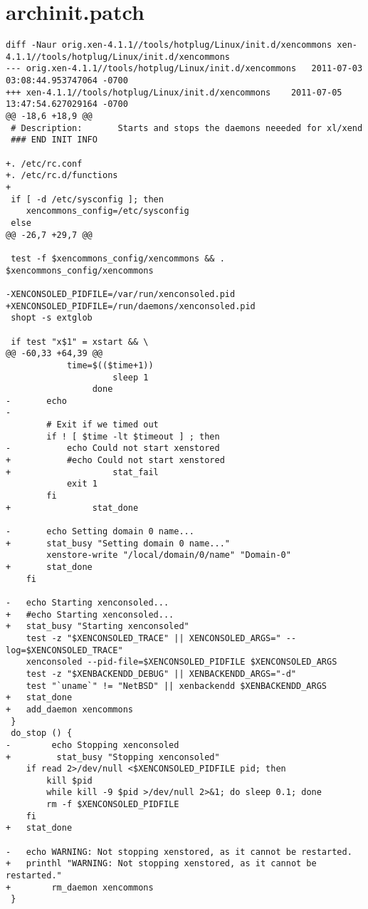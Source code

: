 \section{archinit.patch}
\begin{lstlisting}
diff -Naur orig.xen-4.1.1//tools/hotplug/Linux/init.d/xencommons xen-4.1.1//tools/hotplug/Linux/init.d/xencommons
--- orig.xen-4.1.1//tools/hotplug/Linux/init.d/xencommons	2011-07-03 03:08:44.953747064 -0700
+++ xen-4.1.1//tools/hotplug/Linux/init.d/xencommons	2011-07-05 13:47:54.627029164 -0700
@@ -18,6 +18,9 @@
 # Description:       Starts and stops the daemons neeeded for xl/xend
 ### END INIT INFO
 
+. /etc/rc.conf
+. /etc/rc.d/functions
+
 if [ -d /etc/sysconfig ]; then
 	xencommons_config=/etc/sysconfig
 else
@@ -26,7 +29,7 @@
 
 test -f $xencommons_config/xencommons && . $xencommons_config/xencommons
 
-XENCONSOLED_PIDFILE=/var/run/xenconsoled.pid
+XENCONSOLED_PIDFILE=/run/daemons/xenconsoled.pid
 shopt -s extglob
 
 if test "x$1" = xstart && \
@@ -60,33 +64,39 @@
 		    time=$(($time+1))
                     sleep 1
                 done
-		echo
-
 		# Exit if we timed out
 		if ! [ $time -lt $timeout ] ; then
-		    echo Could not start xenstored
+		    #echo Could not start xenstored
+                    stat_fail
 		    exit 1
 		fi
+                stat_done
 
-		echo Setting domain 0 name...
+		stat_busy "Setting domain 0 name..."
 		xenstore-write "/local/domain/0/name" "Domain-0"
+		stat_done
 	fi
 
-	echo Starting xenconsoled...
+	#echo Starting xenconsoled...
+	stat_busy "Starting xenconsoled"
 	test -z "$XENCONSOLED_TRACE" || XENCONSOLED_ARGS=" --log=$XENCONSOLED_TRACE"
 	xenconsoled --pid-file=$XENCONSOLED_PIDFILE $XENCONSOLED_ARGS
 	test -z "$XENBACKENDD_DEBUG" || XENBACKENDD_ARGS="-d"
 	test "`uname`" != "NetBSD" || xenbackendd $XENBACKENDD_ARGS
+	stat_done
+	add_daemon xencommons
 }
 do_stop () {
-        echo Stopping xenconsoled
+         stat_busy "Stopping xenconsoled"
 	if read 2>/dev/null <$XENCONSOLED_PIDFILE pid; then
 		kill $pid
 		while kill -9 $pid >/dev/null 2>&1; do sleep 0.1; done
 		rm -f $XENCONSOLED_PIDFILE
 	fi
+	stat_done
 
-	echo WARNING: Not stopping xenstored, as it cannot be restarted.
+	printhl "WARNING: Not stopping xenstored, as it cannot be restarted."
+        rm_daemon xencommons
 }
 

\end{lstlisting}
